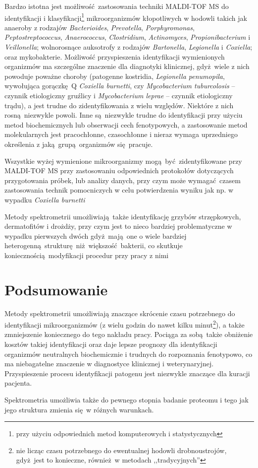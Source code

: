 \documentclass[two column, twoside, a4paper]{article}
\newcommand{\maldi}{MALDI-TOF MS }
\begin{document}
Bardzo istotna jest możliwość zastosowania techniki \maldi do identyfikacji i klasyfikacji\footnote{przy użyciu odpowiednich metod komputerowych i statystycznych} mikroorganizmów kłopotliwych w hodowli takich jak anaeroby z rodzajów \textit{Bacterioides}, \textit{Prevotella}, \textit{Porphyromonas}, \textit{Peptostreptococcus}, \textit{Anaerococcus}, \textit{Clostridium}, \textit{Actinomyces}, \textit{Propionibacterium} i \textit{Veillonella}; wolnorosnące auksotrofy z rodzajów \textit{Bartonella}, \textit{Legionella} i  \textit{Coxiella}; oraz mykobakterie. Możliwość przyspieszenia identyfikacji wymienionych organizmów ma szczególne znaczenie dla diagnotyki klinicznej, gdyż wiele z nich powoduje poważne choroby (patogenne kostridia, \textit{Legionella penumopila}, wywołująca gorączkę Q \textit{Coxiella burnetti}, czy \textit{Mycobacterium tuburcolosis} -- czynnik etiologiczny gruźlicy i \textit{Mycobacterium leprae} -- czynnik etiologiczny trądu), a jest trudne do zidentyfikowania z wielu względów. Niektóre z nich rosną niezwykle powoli. Inne są niezwykle trudne do identyfikacji przy użyciu metod biochemicznych lub obserwacji cech fenotypowych, a zastosowanie metod molekularnych jest pracochłonne, czasochłonne i nieraz wymaga uprzedniego określenia z jaką grupą organizmów się pracuje\autocite{Biswas2013}.

Wszystkie wyżej wymienione mikroorganizmy mogą być zidentyfikowane przy \maldi przy zastosowaniu odpowiednich protokołów dotyczących przygotowania próbek, lub analizy danych, przy czym może wymagać czasem zastosowania technik pomocniczych w celu potwierdzenia wyniku jak np. w wypadku \textit{Coxiella burnetti}\autocite{Biswas2013, Croxatto2012}

Metody spektrometrii umożliwiają także identyfikację grzybów strzępkowych, dermatofitów i drożdży, przy czym jest to nieco bardziej problematyczne w wypadku pierwszych dwóch gdyż mają one o wiele bardziej heterogenną strukturę niż większość bakterii, co skutkuje koniecznością modyfikacji procedur przy pracy z nimi\autocite{Croxatto2012}

\section{Podsumowanie}

Metody spektrometrii umożliwiają znaczące skrócenie czasu potrzebnego do identyfikacji mikroorganizmów (z wielu godzin do nawet kilku minut\footnote{nie licząc czasu potrzebnego do ewentualnej hodowli drobnoustrojów, gdyż jest to konieczne, również w metodach ,,tradycyjnych''}), a także zmniejszenie koniecznego do tego nakładu pracy. Pociąga za sobą także obniżenie kosztów takiej identyfikacji oraz daje lepsze prognozy dla identyfikacji organizmów neutralnych biochemicznie i trudnych do rozpoznania fenotypowo, co ma niebagatelne znaczenie w diagnostyce klinicznej i weterynaryjnej. Przyspieszenie procesu identyfikacji patogenu jest niezwykle znaczące dla kuracji pacjenta.

Spektrometria umożliwia także do pewnego stopnia badanie proteomu i tego jak jego struktura zmienia się w różnych warunkach.

\printbibliography
\end{document}
